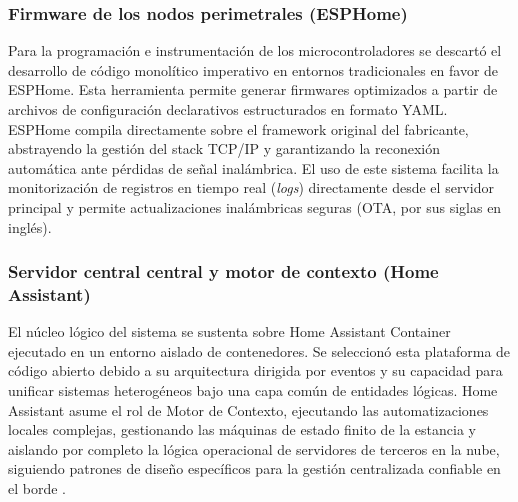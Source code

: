 \subsubsection{Firmware de los nodos perimetrales (ESPHome)}
Para la programación e instrumentación de los microcontroladores se descartó el desarrollo de código monolítico imperativo en entornos tradicionales en favor de ESPHome. Esta herramienta permite generar firmwares optimizados a partir de archivos de configuración declarativos estructurados en formato YAML. ESPHome compila directamente sobre el framework original del fabricante, abstrayendo la gestión del stack TCP/IP y garantizando la reconexión automática ante pérdidas de señal inalámbrica. El uso de este sistema facilita la monitorización de registros en tiempo real (\textit{logs}) directamente desde el servidor principal y permite actualizaciones inalámbricas seguras (OTA, por sus siglas en inglés).

\subsubsection{Servidor central central y motor de contexto (Home Assistant)}
El núcleo lógico del sistema se sustenta sobre Home Assistant Container ejecutado en un entorno aislado de contenedores. Se seleccionó esta plataforma de código abierto debido a su arquitectura dirigida por eventos y su capacidad para unificar sistemas heterogéneos bajo una capa común de entidades lógicas. Home Assistant asume el rol de Motor de Contexto, ejecutando las automatizaciones locales complejas, gestionando las máquinas de estado finito de la estancia y aislando por completo la lógica operacional de servidores de terceros en la nube, siguiendo patrones de diseño específicos para la gestión centralizada confiable en el borde \cite{pahl2018trusted}.

